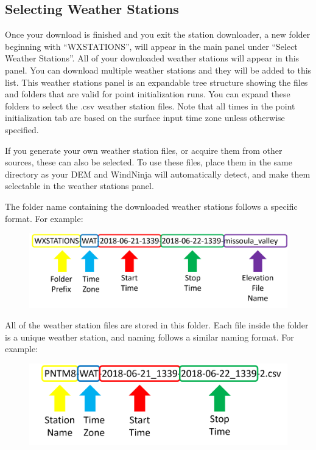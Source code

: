 \documentclass[12pt]{article}
\begin{document}
\subsection{Selecting Weather Stations}
Once your download is finished and you exit the station downloader, a new folder beginning with “WXSTATIONS”, will appear in the main panel under “Select Weather Stations”. All of your downloaded weather stations will appear in this panel. You can download multiple weather stations and they will be added to this list.  This weather stations panel is an expandable tree structure showing the files and folders that are valid for point initialization runs. You can expand these folders to select the .csv weather station files. Note that all times in the point initialization tab are based on the surface input time zone unless otherwise specified.

If you generate your own weather station files, or acquire them from other sources, these can also be selected. To use these files, place them in the same directory as your DEM and WindNinja will automatically detect, and make them selectable in the weather stations panel.

The folder name containing the downloaded weather stations follows a specific format. For example:

\begin{figure}[H]
	\centering
	\label{}
	\includegraphics[scale=0.45]{FolderDiag_1}
\end{figure}

All of the weather station files are stored in this folder. Each file inside the folder is a unique weather station, and naming follows a similar naming format. For example:

\begin{figure}[H]
	\centering
	\label{}
	\includegraphics[scale=0.45]{FileDiag_1}
\end{figure}
\end{document}
